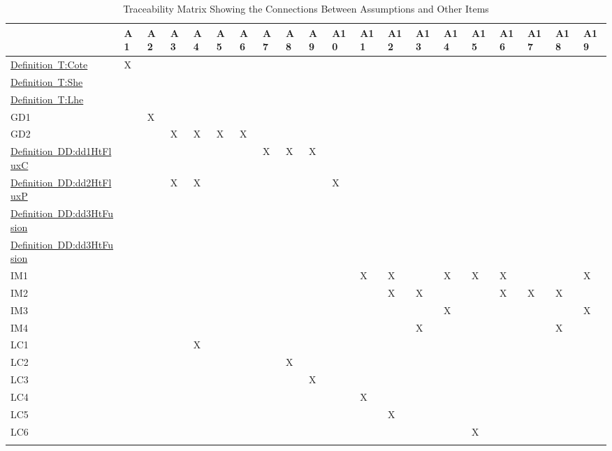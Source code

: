 \documentclass[12pt]{article}
\begin{document}
\begin{longtable}{l l l l l l l l l l l l l l l l l l l l}
\toprule
 & A1 & A2 & A3 & A4 & A5 & A6 & A7 & A8 & A9 & A10 & A11 & A12 & A13 & A14 & A15 & A16 & A17 & A18 & A19
\\
\midrule
\hyperref[T:Cote]{Definition~T:Cote} & X &  &  &  &  &  &  &  &  &  &  &  &  &  &  &  &  &  & 
\\
\hyperref[T:She]{Definition~T:She} &  &  &  &  &  &  &  &  &  &  &  &  &  &  &  &  &  &  & 
\\
\hyperref[T:Lhe]{Definition~T:Lhe} &  &  &  &  &  &  &  &  &  &  &  &  &  &  &  &  &  &  & 
\\
GD1 &  & X &  &  &  &  &  &  &  &  &  &  &  &  &  &  &  &  & 
\\
GD2 &  &  & X & X & X & X &  &  &  &  &  &  &  &  &  &  &  &  & 
\\
\hyperref[DD:dd1HtFluxC]{Definition~DD:dd1HtFluxC} &  &  &  &  &  &  & X & X & X &  &  &  &  &  &  &  &  &  & 
\\
\hyperref[DD:dd2HtFluxP]{Definition~DD:dd2HtFluxP} &  &  & X & X &  &  &  &  &  & X &  &  &  &  &  &  &  &  & 
\\
\hyperref[DD:dd3HtFusion]{Definition~DD:dd3HtFusion} &  &  &  &  &  &  &  &  &  &  &  &  &  &  &  &  &  &  & 
\\
\hyperref[DD:dd3HtFusion]{Definition~DD:dd3HtFusion} &  &  &  &  &  &  &  &  &  &  &  &  &  &  &  &  &  &  & 
\\
IM1 &  &  &  &  &  &  &  &  &  &  & X & X &  & X & X & X &  &  & X
\\
IM2 &  &  &  &  &  &  &  &  &  &  &  & X & X &  &  & X & X & X & 
\\
IM3 &  &  &  &  &  &  &  &  &  &  &  &  &  & X &  &  &  &  & X
\\
IM4 &  &  &  &  &  &  &  &  &  &  &  &  & X &  &  &  &  & X & 
\\
LC1 &  &  &  & X &  &  &  &  &  &  &  &  &  &  &  &  &  &  & 
\\
LC2 &  &  &  &  &  &  &  & X &  &  &  &  &  &  &  &  &  &  & 
\\
LC3 &  &  &  &  &  &  &  &  & X &  &  &  &  &  &  &  &  &  & 
\\
LC4 &  &  &  &  &  &  &  &  &  &  & X &  &  &  &  &  &  &  & 
\\
LC5 &  &  &  &  &  &  &  &  &  &  &  & X &  &  &  &  &  &  & 
\\
LC6 &  &  &  &  &  &  &  &  &  &  &  &  &  &  & X &  &  &  & 
\\
\bottomrule
\caption{Traceability Matrix Showing the Connections Between Assumptions and Other Items}
\label{Table:TMStCBAaOI}
\end{longtable}
\end{document}
